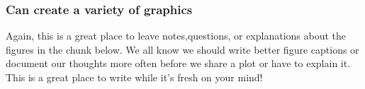 \documentclass[
]{article}
\newenvironment{Shaded}{\begin{snugshade}}{\end{snugshade}}
\newcommand{\AttributeTok}[1]{\textcolor[rgb]{0.77,0.63,0.00}{#1}}
\newcommand{\CommentTok}[1]{\textcolor[rgb]{0.56,0.35,0.01}{\textit{#1}}}
\newcommand{\DecValTok}[1]{\textcolor[rgb]{0.00,0.00,0.81}{#1}}
\newcommand{\FloatTok}[1]{\textcolor[rgb]{0.00,0.00,0.81}{#1}}
\newcommand{\FunctionTok}[1]{\textcolor[rgb]{0.00,0.00,0.00}{#1}}
\newcommand{\NormalTok}[1]{#1}
\newcommand{\OtherTok}[1]{\textcolor[rgb]{0.56,0.35,0.01}{#1}}
\newcommand{\SpecialCharTok}[1]{\textcolor[rgb]{0.00,0.00,0.00}{#1}}
\begin{document}
\hypertarget{can-create-a-variety-of-graphics}{%
\subsubsection{Can create a variety of
graphics}\label{can-create-a-variety-of-graphics}}

Again, this is a great place to leave notes,questions, or explanations
about the figures in the chunk below. We all know we should write better
figure captions or document our thoughts more often before we share a
plot or have to explain it. This is a great place to write while it's
fresh on your mind!

\begin{Shaded}
\end{Shaded}
\end{document}
